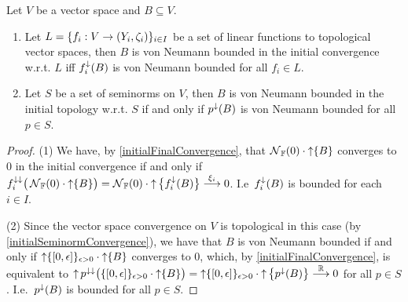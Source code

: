 \begin{proposition} \label{vonNeumannBoundednessInitialSpace}
Let $V$ be a vector space and $B\subseteq V$.
\begin{enumerate}
\item Let $L = \{f_i:V\to \sSet{Y_i,\zeta_i}\}_{i\in I}$ be a set of linear functions to topological vector spaces, then $B$ is von Neumann bounded in the initial convergence w.r.t. $L$ iff $f_i^\downarrow(B)$ is von Neumann bounded for all $f_i\in L$.
\item Let $S$ be a set of seminorms on $V$, then $B$ is von Neumann bounded in the initial topology w.r.t. $S$ \textup{if and only if} $p^\downarrow(B)$ is von Neumann bounded for all $p\in S$.
\end{enumerate}
\end{proposition}
\begin{proof}
(1) We have, by \ref{initialFinalConvergence}, that $\operatorname{\mathcal{N}}_{\mathbb{F}}(0)\cdot\operatorname{\uparrow} \{B\}$ converges to $0$ in the initial convergence if and only if $f_i^{\downarrow\downarrow}\big(\operatorname{\mathcal{N}}_{\mathbb{F}}(0)\cdot\operatorname{\uparrow} \{B\}\big) = \operatorname{\mathcal{N}}_{\mathbb{F}}(0)\cdot\operatorname{\uparrow} \big\{f_i^{\downarrow}(B)\big\} \overset{\xi_i}{\longrightarrow} 0$. I.e\ $f_i^\downarrow(B)$ is bounded for each $i\in I$.

(2) Since the vector space convergence on $V$ is topological in this case (by \ref{initialSeminormConvergence}), we have that $B$ is von Neumann bounded if and only if $\upset \{\interval{0,\epsilon}\}_{\epsilon > 0}\cdot\upset\{B\}$ converges to $0$, which, by \ref{initialFinalConvergence}, is equivalent to $\upset p^{\imf\imf}\big(\{\interval{0,\epsilon}\}_{\epsilon > 0}\cdot\upset\{B\}\big) = \upset \{\interval{0,\epsilon}\}_{\epsilon > 0}\cdot\upset\big\{p^{\imf}(B)\big\} \overset{\R}{\longrightarrow} 0$ for all $p\in S$. I.e.\ $p^{\downarrow}(B)$ is bounded for all $p\in S$.
\end{proof}

